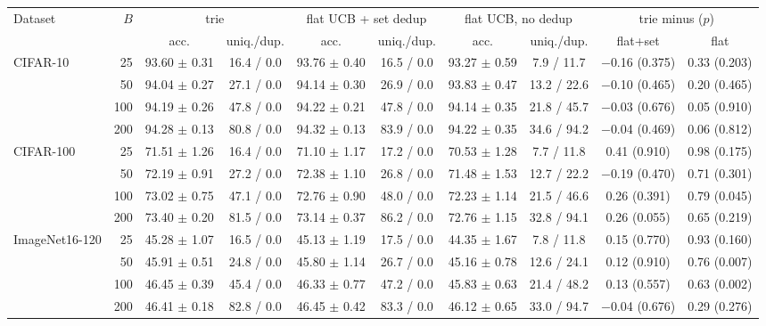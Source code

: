 \begin{tabular}{@{}lrcccccccc@{}}
\toprule
\multirow{2}{*}{Dataset} & \multirow{2}{*}{$B$} & \multicolumn{2}{c}{trie} & \multicolumn{2}{c}{flat UCB + set dedup} & \multicolumn{2}{c}{flat UCB, no dedup} & \multicolumn{2}{c}{trie minus ($p$)}\\
\cmidrule(lr){3-4}\cmidrule(lr){5-6}\cmidrule(lr){7-8}\cmidrule(lr){9-10}
 & & acc. & uniq./dup. & acc. & uniq./dup. & acc. & uniq./dup. & flat+set & flat\\
\midrule
CIFAR-10 & 25 & 93.60 $\pm$ 0.31 & 16.4 / 0.0 & 93.76 $\pm$ 0.40 & 16.5 / 0.0 & 93.27 $\pm$ 0.59 & 7.9 / 11.7 & $-$0.16 (0.375) & 0.33 (0.203)\\
 & 50 & 94.04 $\pm$ 0.27 & 27.1 / 0.0 & 94.14 $\pm$ 0.30 & 26.9 / 0.0 & 93.83 $\pm$ 0.47 & 13.2 / 22.6 & $-$0.10 (0.465) & 0.20 (0.465)\\
 & 100 & 94.19 $\pm$ 0.26 & 47.8 / 0.0 & 94.22 $\pm$ 0.21 & 47.8 / 0.0 & 94.14 $\pm$ 0.35 & 21.8 / 45.7 & $-$0.03 (0.676) & 0.05 (0.910)\\
 & 200 & 94.28 $\pm$ 0.13 & 80.8 / 0.0 & 94.32 $\pm$ 0.13 & 83.9 / 0.0 & 94.22 $\pm$ 0.35 & 34.6 / 94.2 & $-$0.04 (0.469) & 0.06 (0.812)\\
\midrule
CIFAR-100 & 25 & 71.51 $\pm$ 1.26 & 16.4 / 0.0 & 71.10 $\pm$ 1.17 & 17.2 / 0.0 & 70.53 $\pm$ 1.28 & 7.7 / 11.8 & 0.41 (0.910) & 0.98 (0.175)\\
 & 50 & 72.19 $\pm$ 0.91 & 27.2 / 0.0 & 72.38 $\pm$ 1.10 & 26.8 / 0.0 & 71.48 $\pm$ 1.53 & 12.7 / 22.2 & $-$0.19 (0.470) & 0.71 (0.301)\\
 & 100 & 73.02 $\pm$ 0.75 & 47.1 / 0.0 & 72.76 $\pm$ 0.90 & 48.0 / 0.0 & 72.23 $\pm$ 1.14 & 21.5 / 46.6 & 0.26 (0.391) & 0.79 (0.045)\\
 & 200 & 73.40 $\pm$ 0.20 & 81.5 / 0.0 & 73.14 $\pm$ 0.37 & 86.2 / 0.0 & 72.76 $\pm$ 1.15 & 32.8 / 94.1 & 0.26 (0.055) & 0.65 (0.219)\\
\midrule
ImageNet16-120 & 25 & 45.28 $\pm$ 1.07 & 16.5 / 0.0 & 45.13 $\pm$ 1.19 & 17.5 / 0.0 & 44.35 $\pm$ 1.67 & 7.8 / 11.8 & 0.15 (0.770) & 0.93 (0.160)\\
 & 50 & 45.91 $\pm$ 0.51 & 24.8 / 0.0 & 45.80 $\pm$ 1.14 & 26.7 / 0.0 & 45.16 $\pm$ 0.78 & 12.6 / 24.1 & 0.12 (0.910) & 0.76 (0.007)\\
 & 100 & 46.45 $\pm$ 0.39 & 45.4 / 0.0 & 46.33 $\pm$ 0.77 & 47.2 / 0.0 & 45.83 $\pm$ 0.63 & 21.4 / 48.2 & 0.13 (0.557) & 0.63 (0.002)\\
 & 200 & 46.41 $\pm$ 0.18 & 82.8 / 0.0 & 46.45 $\pm$ 0.42 & 83.3 / 0.0 & 46.12 $\pm$ 0.65 & 33.0 / 94.7 & $-$0.04 (0.676) & 0.29 (0.276)\\
\bottomrule
\end{tabular}

